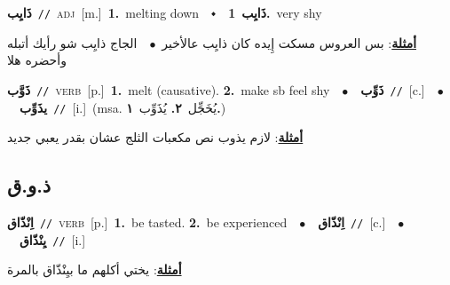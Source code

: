 \documentclass[10pt,a4paper,twoside]{article} %
\begin{document}
\begin{multicols}{2}
{\setlength\topsep{0pt}\textbf{\foreignlanguage{arabic}{ذَايِب}}\ {\color{gray}\texttt{//}\color{black}}\ \textsc{adj}\ [m.]\ \textbf{1.}~melting down\ \ $\smblkdiamond$\ \ \setlength\topsep{0pt}\textbf{\foreignlanguage{arabic}{ذَايِب}}\ \textbf{1.}~very shy\  \begin{flushright}\color{gray}\foreignlanguage{arabic}{\textbf{\underline{\foreignlanguage{arabic}{أمثلة}}}: بس العروس مسكت إِيده كان ذايِب عالأخير\ $\bullet$\ \  الجاج ذايِب شو رأيك أتبله وأحضره هلا}\end{flushright}\color{black}} \vspace{2mm}

{\setlength\topsep{0pt}\textbf{\foreignlanguage{arabic}{ذَوَّب}}\ {\color{gray}\texttt{//}\color{black}}\ \textsc{verb}\ [p.]\ \textbf{1.}~melt (causative).  \textbf{2.}~make sb feel shy\ \ $\bullet$\ \ \setlength\topsep{0pt}\textbf{\foreignlanguage{arabic}{ذَوِّب}}\ {\color{gray}\texttt{//}\color{black}}\ [c.]\ \ $\bullet$\ \ \setlength\topsep{0pt}\textbf{\foreignlanguage{arabic}{يذَوِّب}}\ {\color{gray}\texttt{//}\color{black}}\ [i.]\ \color{gray}(msa. \foreignlanguage{arabic}{يُخَجِّل}~\foreignlanguage{arabic}{\textbf{٢.}}  \foreignlanguage{arabic}{يُذَوِّب}~\foreignlanguage{arabic}{\textbf{١.}})\color{black}\  \begin{flushright}\color{gray}\foreignlanguage{arabic}{\textbf{\underline{\foreignlanguage{arabic}{أمثلة}}}: لازم يذوب نص مكعبات الثلج عشان بقدر يعبي جديد}\end{flushright}\color{black}} \vspace{2mm}

\vspace{-3mm}
\subsection*{\color{blue}\foreignlanguage{arabic}{ذ.و.ق}\color{blue}{}} 

{\setlength\topsep{0pt}\textbf{\foreignlanguage{arabic}{اِنْذّاق}}\ {\color{gray}\texttt{//}\color{black}}\ \textsc{verb}\ [p.]\ \textbf{1.}~be tasted.  \textbf{2.}~be experienced\ \ $\bullet$\ \ \setlength\topsep{0pt}\textbf{\foreignlanguage{arabic}{اِنْذّاق}}\ {\color{gray}\texttt{//}\color{black}}\ [c.]\ \ $\bullet$\ \ \setlength\topsep{0pt}\textbf{\foreignlanguage{arabic}{يِنْذّاق}}\ {\color{gray}\texttt{//}\color{black}}\ [i.]\  \begin{flushright}\color{gray}\foreignlanguage{arabic}{\textbf{\underline{\foreignlanguage{arabic}{أمثلة}}}: يختي أكلهم ما بيِنْذّاق بالمرة}\end{flushright}\color{black}} \vspace{2mm}


\end{multicols}
\end{document}
